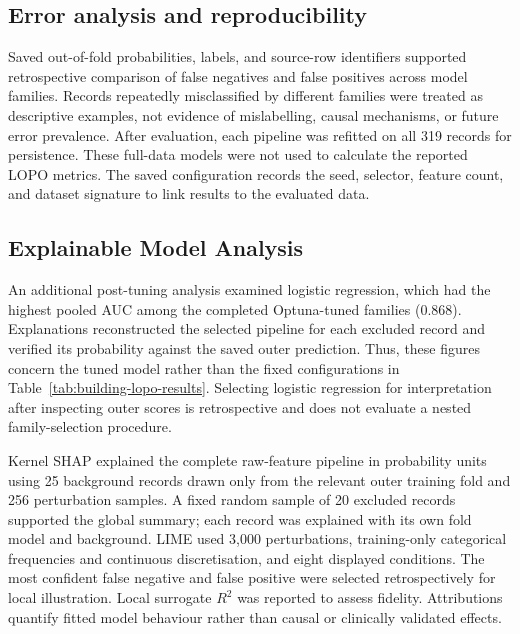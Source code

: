 \subsection{Error analysis and reproducibility}
Saved out-of-fold probabilities, labels, and source-row identifiers supported retrospective comparison of false negatives and false positives across model families. Records repeatedly misclassified by different families were treated as descriptive examples, not evidence of mislabelling, causal mechanisms, or future error prevalence. After evaluation, each pipeline was refitted on all 319 records for persistence. These full-data models were not used to calculate the reported LOPO metrics. The saved configuration records the seed, selector, feature count, and dataset signature to link results to the evaluated data.

\subsection{Explainable Model Analysis}
An additional post-tuning analysis examined logistic regression, which had the highest pooled AUC among the completed Optuna-tuned families (0.868). Explanations reconstructed the selected pipeline for each excluded record and verified its probability against the saved outer prediction. Thus, these figures concern the tuned model rather than the fixed configurations in Table~\ref{tab:building-lopo-results}. Selecting logistic regression for interpretation after inspecting outer scores is retrospective and does not evaluate a nested family-selection procedure.

Kernel SHAP \parencite{lundberg2017shap} explained the complete raw-feature pipeline in probability units using 25 background records drawn only from the relevant outer training fold and 256 perturbation samples. A fixed random sample of 20 excluded records supported the global summary; each record was explained with its own fold model and background. LIME \parencite{ribeiro2016lime} used 3,000 perturbations, training-only categorical frequencies and continuous discretisation, and eight displayed conditions. The most confident false negative and false positive were selected retrospectively for local illustration. Local surrogate $R^2$ was reported to assess fidelity. Attributions quantify fitted model behaviour rather than causal or clinically validated effects.
